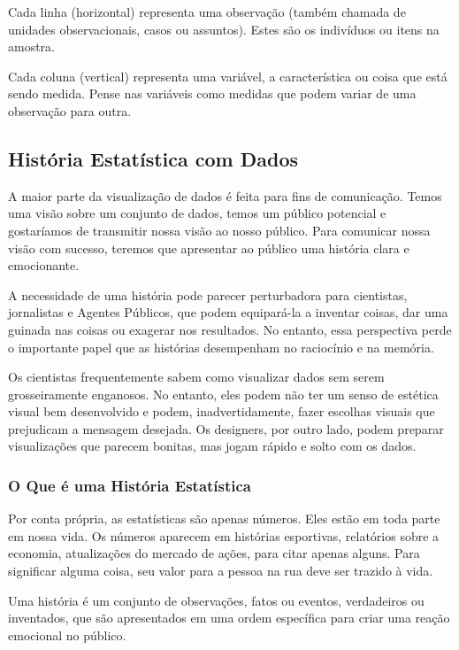 Cada linha (horizontal) representa uma observação (também chamada de u\-nidades observacionais, casos ou assuntos). Estes são os indivíduos ou itens na amostra.\vskip0.3cm

Cada coluna (vertical) representa uma variável, a característica ou coisa que está sendo medida. Pense nas variáveis como medidas que podem variar de uma observação para outra.


\newpage
\subsection{História Estatística com Dados}

A maior parte da visualização de dados é feita para fins de comunicação. Temos uma visão sobre um conjunto de dados, temos um público potencial e gostaríamos de transmitir nossa visão ao nosso público. Para comunicar nossa visão com sucesso, teremos que apresentar ao público uma história clara e emocionante. \vskip0.3cm

A necessidade de uma história pode parecer perturbadora para cientistas, jornalistas e Agentes Públicos, que podem equipará-la a inventar coisas, dar uma guinada nas coisas ou exagerar nos resultados. No entanto, essa perspectiva perde o importante papel que as histórias desempenham no raciocínio e na me\-mória.\vskip0.3cm

Os cientistas frequentemente sabem como visualizar dados sem serem grosseiramente enganosos. No entanto, eles podem não ter um senso de estética visual bem desenvolvido e podem, inadvertidamente, fazer escolhas visuais que prejudicam a mensagem desejada. Os designers, por outro lado, podem preparar visualizações que parecem bonitas, mas jogam rápido e solto com os dados. 

\subsubsection{O Que é uma História Estatística}

Por conta própria, as estatísticas são apenas números. Eles estão em toda parte em nossa vida. Os números aparecem em histórias esportivas, relatórios sobre a economia, atualizações do mercado de ações, para citar apenas alguns. Para significar alguma coisa, seu valor para a pessoa na rua deve ser trazido à vida.\vskip0.3cm 

Uma história é um conjunto de observações, fatos ou eventos, verdadeiros ou inventados, que são apresentados em uma ordem específica para criar uma reação emocional no público.\vskip0.3cm 

